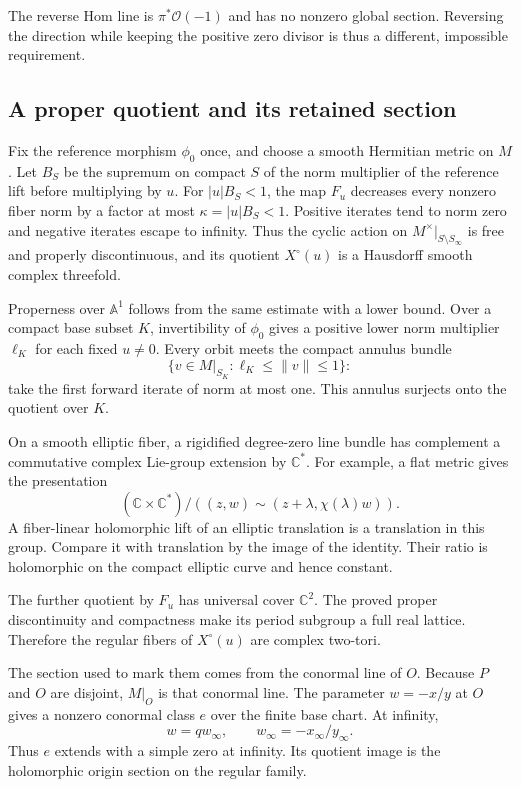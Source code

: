 \documentclass[11pt]{article}
\numberwithin{equation}{section}
\begin{document}
The reverse Hom line is $\pi^*\mathcal O(-1)$ and has no nonzero
global section. Reversing the direction while keeping the positive
zero divisor is thus a different, impossible requirement.

\subsection{A proper quotient and its retained section}

Fix the reference morphism $\phi_0$ once, and choose a smooth
Hermitian metric on $M$. Let $B_S$ be the supremum on compact
$S$ of the norm multiplier of the reference lift before multiplying
by $u$. For $|u|B_S<1$, the map $F_u$ decreases every nonzero
fiber norm by a factor at most $\kappa=|u|B_S<1$.
Positive iterates tend to norm zero and negative iterates escape
to infinity. Thus the cyclic action on
$M^\times|_{S\setminus S_\infty}$ is free and properly
discontinuous, and its quotient $X^\circ(u)$ is a Hausdorff smooth
complex threefold.

Properness over $\mathbb A^1$ follows from the same estimate with
a lower bound. Over a compact base subset $K$, invertibility of
$\phi_0$ gives a positive lower norm multiplier $\ell_K$ for each
fixed $u\ne0$. Every orbit meets the compact annulus bundle
\[
 \{v\in M|_{S_K}:\ell_K\leq\|v\|\leq1\}:
\]
take the first forward iterate of norm at most one. This annulus
surjects onto the quotient over $K$.

On a smooth elliptic fiber, a rigidified degree-zero line bundle
has complement a commutative complex Lie-group extension by
$\mathbb C^*$. For example, a flat metric gives the presentation
\[
 (\mathbb C\times\mathbb C^*)/
 ((z,w)\sim(z+\lambda,\chi(\lambda)w)).
\]
A fiber-linear holomorphic lift of an elliptic translation is a
translation in this group. Compare it with translation by the image
of the identity. Their ratio is holomorphic on the compact elliptic
curve and hence constant.

The further quotient by $F_u$ has
universal cover $\mathbb C^2$. The proved proper discontinuity and
compactness make its period subgroup a full real lattice. Therefore
the regular fibers of $X^\circ(u)$ are complex two-tori.

The section used to mark them comes from the conormal line of $O$.
Because $P$ and $O$ are disjoint, $M|_O$ is that conormal line.
The parameter $w=-x/y$ at $O$ gives a nonzero conormal class $e$
over the finite base chart. At infinity,
\begin{equation}\label{hol:eq:conormal-infinity}
 w=q w_\infty,\qquad w_\infty=-x_\infty/y_\infty.
\end{equation}
Thus $e$ extends with a simple zero at infinity. Its quotient image
is the holomorphic origin section on the regular family.
\end{document}
